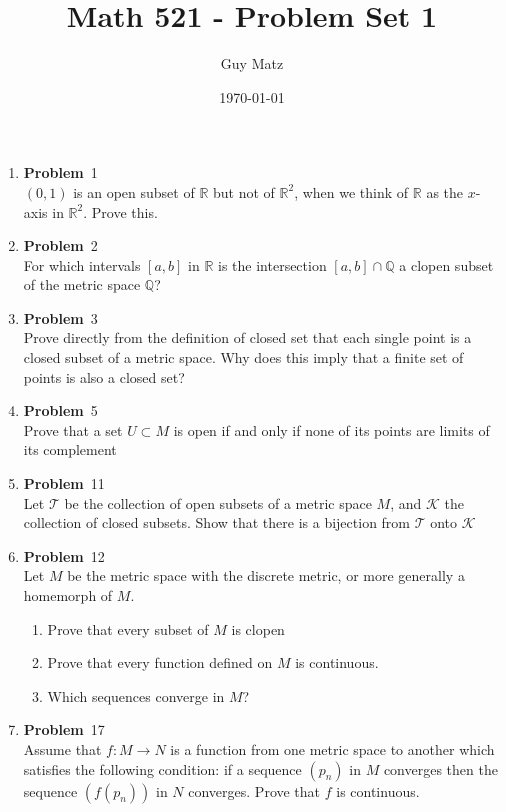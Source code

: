\documentclass[12pt]{amsart}
\title{\textbf{Math 521 - Problem Set 1}}
\author{Guy Matz}
\date{\today}
\newcommand{\benu}{\begin{enumerate}}
\newcommand{\eenu}{\end{enumerate}}
\theoremstyle{definition}
\newcommand{\mbR}{\mathbb{R}}
\newcommand{\mbQ}{\mathbb{Q}}
\newcommand{\mc}[1]{\mathcal{#1}}
\newcommand{\itep}{\item {\bfseries Problem}\ }
\begin{document}
 


\begin{enumerate}[series=p]
\itep 1 \\
$(0, 1)$ is an open subset of $\mbR$ but not of $\mbR^2$, when we think of $\mbR$ as the $x$-axis in $\mbR^2$.  Prove this.


\newpage

\itep 2 \\
For which intervals $[a,b]$ in $\mbR$ is the intersection $[a,b] \cap \mbQ$ a clopen subset of the metric space $\mbQ$?

\newpage

\itep 3\\
Prove directly from the definition of closed set that each single point is a closed subset of a metric space.  Why does this imply that a finite set of points is also a closed set?

\newpage


\itep 5\\
Prove that a set $U \subset M$ is open if and only if none of its points are limits of its complement

\newpage

\itep 11\\
Let $\mc{T}$ be the collection of open subsets of a metric space $M$, and $\mc{K}$ the collection of closed subsets.  Show that there is a bijection from $\mc{T}$ onto $\mc{K}$

\newpage

\itep 12\\
Let $M$ be the metric space with the discrete metric, or more generally a homemorph of $M$.
\benu
\item Prove that every subset of $M$ is clopen\\
\item Prove that every function defined on $M$ is continuous.\\
\item Which sequences converge in $M$?
\eenu

\newpage

\itep 17 \\
Assume that $f:M \rightarrow N$ is a function from one metric space to another which satisfies the following condition:  if a sequence $(p_n)$ in $M$ converges then the sequence $(f(p_n))$ in $N$ converges.  Prove that $f$ is continuous.


\end{enumerate}
\end{document}

